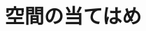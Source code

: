 \documentclass[../../topic_linear-algebra]{subfiles}
\begin{document}
\chapter{空間の当てはめ}
\end{document}
